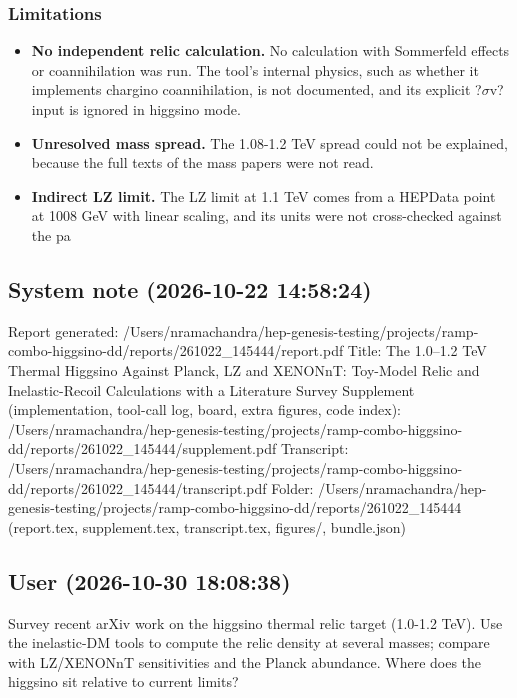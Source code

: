 \documentclass[11pt,a4paper]{article}
\begin{document}
\subsubsection*{Limitations}
\begin{itemize}
  \item \textbf{No independent relic calculation.} No calculation with Sommerfeld effects or coannihilation was run. The tool's internal physics, such as whether it implements chargino coannihilation, is not documented, and its explicit ?$\sigma$v? input is ignored in higgsino mode.
  \item \textbf{Unresolved mass spread.} The 1.08-1.2 TeV spread could not be explained, because the full texts of the mass papers were not read.
  \item \textbf{Indirect LZ limit.} The LZ limit at 1.1 TeV comes from a HEPData point at 1008 GeV with linear scaling, and its units were not cross-checked against the pa
\end{itemize}
\subsection*{System note \small(2026-10-22 14:58:24)}
Report generated: /Users/nramachandra/hep-genesis-testing/projects/ramp-combo-higgsino-dd/reports/261022\_145444/report.pdf Title: The 1.0--1.2 TeV Thermal Higgsino Against Planck, LZ and XENONnT: Toy-Model Relic and Inelastic-Recoil Calculations with a Literature Survey Supplement (implementation, tool-call log, board, extra figures, code index): /Users/nramachandra/hep-genesis-testing/projects/ramp-combo-higgsino-dd/reports/261022\_145444/supplement.pdf Transcript: /Users/nramachandra/hep-genesis-testing/projects/ramp-combo-higgsino-dd/reports/261022\_145444/transcript.pdf Folder: /Users/nramachandra/hep-genesis-testing/projects/ramp-combo-higgsino-dd/reports/261022\_145444 (report.tex, supplement.tex, transcript.tex, figures/, bundle.json)

\subsection*{User \small(2026-10-30 18:08:38)}
Survey recent arXiv work on the higgsino thermal relic target (1.0-1.2 TeV). Use the inelastic-DM tools to compute the relic density at several masses; compare with LZ/XENONnT sensitivities and the Planck abundance. Where does the higgsino sit relative to current limits?
\end{document}
